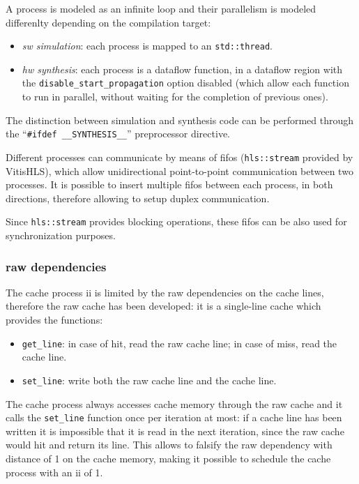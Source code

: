 \documentclass[11pt,a4paper,oneside]{memoir}
\begin{document}
A process is modeled as an infinite loop and their parallelism is modeled
differenlty depending on the compilation target:
\begin{itemize}
	\item \emph{\ac{sw} simulation}: each process is mapped to an
		\texttt{std::thread}.
	\item \emph{\ac{hw} synthesis}: each process is a dataflow function, in
		a dataflow region with the \texttt{disable\_start\_propagation}
		option disabled (which allow each function to run in parallel,
		without waiting for the completion of previous ones).
\end{itemize}
The distinction between simulation and synthesis code can be performed through
the ``\texttt{\#ifdef \_\_SYNTHESIS\_\_}'' preprocessor directive.

Different processes can communicate by means of \acp{fifo} (\texttt{hls::stream}
provided by Vitis\texttrademark HLS), which allow unidirectional point-to-point
communication between two processes. It is possible to insert multiple
\acp{fifo} between each process, in both directions, therefore allowing to
setup duplex communication.

Since \texttt{hls::stream} provides blocking operations, these \acp{fifo} can
be also used for synchronization purposes.

\subsubsection{\ac{raw} dependencies}
The cache process \ac{ii} is limited by the \ac{raw} dependencies on the cache
lines, therefore the \ac{raw} cache has been developed: it is a single-line
cache which provides the functions:
\begin{itemize}
	\item \texttt{get\_line}: in case of hit, read the \ac{raw} cache line;
		in case of miss, read the cache line.
	\item \texttt{set\_line}: write both the \ac{raw} cache line and the
		cache line.
\end{itemize}

The cache process always accesses cache memory through the \ac{raw} cache and it
calls the \texttt{set\_line} function once per iteration at most: if a cache
line has been written it is impossible that it is read in the next iteration,
since the \ac{raw} cache would hit and return its line. This allows to falsify
the \ac{raw} dependency with distance of 1 on the cache memory, making it
possible to schedule the cache process with an \ac{ii} of 1.
\end{document}

